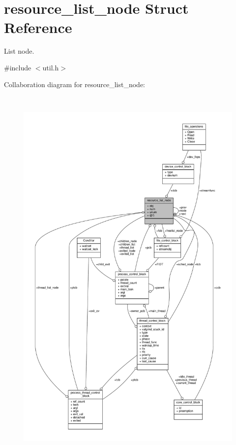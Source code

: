 \hypertarget{structresource__list__node}{}\section{resource\+\_\+list\+\_\+node Struct Reference}
\label{structresource__list__node}


List node.  




{\ttfamily \#include $<$util.\+h$>$}



Collaboration diagram for resource\+\_\+list\+\_\+node\+:
\nopagebreak
\begin{figure}[H]
\begin{center}
\leavevmode
\includegraphics[height=550pt]{structresource__list__node__coll__graph}
\end{center}
\end{figure}
